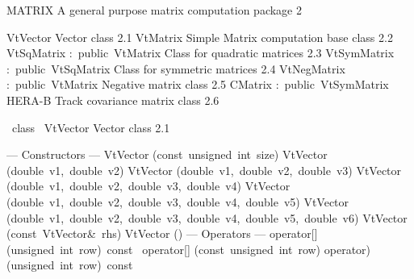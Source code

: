 \documentclass{article}
\begin{document}
\begin{cxxentry}
{}
        {MATRIX}
        {}
        {A general purpose matrix computation package}
        {2}
\begin{cxxnames}
        {VtVector}
        {}
        {Vector class }
        {2.1}
        {VtMatrix}
        {}
        {Simple Matrix computation base class}
        {2.2}
        {VtSqMatrix}
        {:\ public\ VtMatrix}
        {Class for quadratic matrices}
        {2.3}
        {VtSymMatrix}
        {:\ public\ VtSqMatrix}
        {Class for symmetric matrices}
        {2.4}
        {VtNegMatrix}
        {:\ public\ VtMatrix}
        {Negative matrix class}
        {2.5}
        {CMatrix}
        {:\ public\ VtSymMatrix}
        {HERA-B Track covariance matrix class}
        {2.6}
\end{cxxnames}
\begin{cxxclass}
{\ class\ }
        {VtVector}
        {}
        {Vector class }
        {2.1}
\begin{cxxpublic}
\cxxitem{}
        {--- Constructors --- }
        {}
        {}
        {}
\label{cxx.2.1.1}
\cxxitem{}
        {VtVector}
        {(const\ unsigned\ int\ size)}
        {}
        {}
\label{cxx.2.1.2}
\cxxitem{}
        {VtVector}
        {(double\ v1,\ double\ v2)}
        {}
        {}
\label{cxx.2.1.3}
\cxxitem{}
        {VtVector}
        {(double\ v1,\ double\ v2,\ double\ v3)}
        {}
        {}
\label{cxx.2.1.4}
\cxxitem{}
        {VtVector}
        {(double\ v1,\ double\ v2,\ double\ v3,\ double\ v4)}
        {}
        {}
\label{cxx.2.1.5}
\cxxitem{}
        {VtVector}
        {(double\ v1,\ double\ v2,\ double\ v3,\ double\ v4,\ double\ v5)}
        {}
        {}
\label{cxx.2.1.6}
\cxxitem{}
        {VtVector}
        {(double\ v1,\ double\ v2,\ double\ v3,\ double\ v4,\ double\ v5,\ double\ v6)}
        {}
        {}
\label{cxx.2.1.7}
\cxxitem{}
        {VtVector}
        {(const\ VtVector\&\ rhs)}
        {}
        {}
\label{cxx.2.1.8}
\cxxitem{}
        {\cxxtilde VtVector}
        {()}
        {}
        {}
\label{cxx.2.1.9}
\cxxitem{}
        {--- Operators --- }
        {}
        {}
        {}
\label{cxx.2.1.10}
        {operator[]}
        {(unsigned\ int\ row)\ const\ }
        {}
        {}
\label{cxx.2.1.11}
        {operator[]}
        {(const\ unsigned\ int\ row)}
        {}
        {}
\label{cxx.2.1.12}
        {operator)}
        {(unsigned\ int\ row)\ const\ }

\end{cxxpublic}
\end{cxxclass}
\end{cxxentry}
\end{document}
